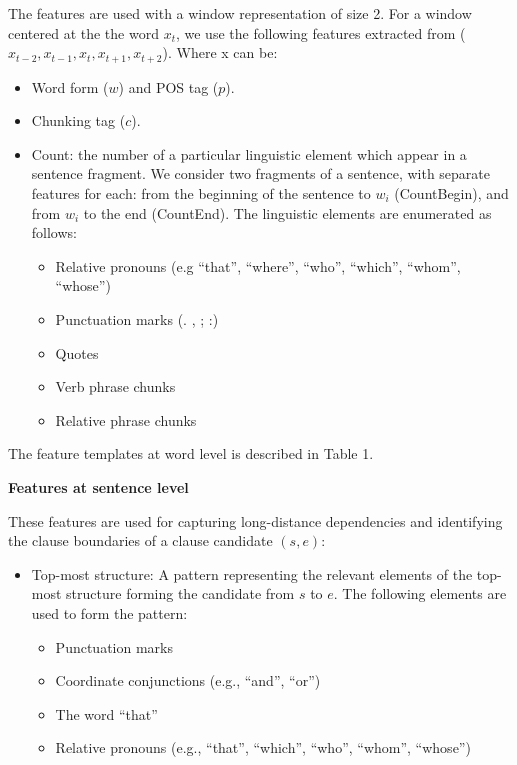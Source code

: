\documentclass[english]{jnlp_1.4}
\begin{document}
The features are used with a window representation of size 2. For a
window centered at the the word $x_t$, we use the following features
extracted from ($x_{t-2}, x_{t-1}, x_t, x_{t+1}, x_{t+2}$). Where x
can be: {\renewcommand{\labelitemi}{}
\begin{itemize}
\item Word form ($w$) and POS tag ($p$).
\item Chunking tag ($c$).
\item Count: the number of a particular linguistic element which appear in a
sentence fragment. We consider two fragments of a sentence, with
separate features for each: from the beginning of the sentence to
$w_i$ (CountBegin), and from $w_i$ to the end (CountEnd). The
linguistic elements are enumerated as follows:
\begin{itemize}
\item Relative pronouns (e.g ``that'', ``where'', ``who'', ``which'', ``whom'', ``whose'')
\item Punctuation marks (. , ; :)
\item Quotes
\item Verb phrase chunks
\item Relative phrase chunks
\end{itemize}
\end{itemize}
The feature templates at word level is described in Table 1.


\begin{table}[b]
\caption{Feature templates at word level}
\label{table:fea}

\end{table}


{\bf \noindent Features at sentence level}

These features are used for capturing long-distance dependencies
and identifying the clause boundaries of a clause candidate
$(s,e)$:
\begin{itemize}
\item Top-most structure: A pattern representing the relevant
elements of the top-most structure forming the candidate from $s$ to
$e$. The following elements are used to form the pattern:
\begin{itemize}
\item Punctuation marks

\item Coordinate conjunctions (e.g., ``and'', ``or'')

\item The word ``that''

\item Relative pronouns (e.g., ``that'', ``which'', ``who'', ``whom'',
``whose'')


\end{itemize}
\end{itemize}}
\end{document}
